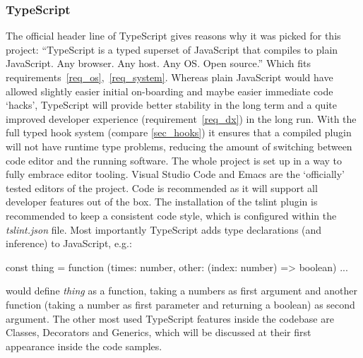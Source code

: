 \subsubsection*{TypeScript}
 The official header line of TypeScript gives reasons why
  it was picked for this project: ``TypeScript is a typed superset of JavaScript that compiles
  to plain JavaScript. Any browser. Any host. Any OS\@. Open
  source.''\cite{noauthor_typescript_2018} Which fits
  requirements~\ref{req_os},~\ref{req_system}. Whereas plain JavaScript would
  have allowed slightly easier initial on-boarding and maybe easier immediate
  code `hacks', TypeScript will provide better stability in the long term and a
  quite improved developer experience (requirement~\ref{req_dx}) in the long
  run. With the full typed hook system (compare \autoref{sec_hooks}) it ensures
  that a compiled plugin will not have runtime type problems, reducing the
  amount of switching between code editor and the running software. The whole
  project is set up in a way to fully embrace editor tooling. Visual Studio
  Code\cite*{noauthor_visual_nodate} and Emacs\cite*{noauthor_gnu_nodate} are
  the `officially' tested editors of the project. Code is recommended as it will
  support all developer features out of the box. The installation of the
  tslint\cite*{noauthor_tslint_nodate} plugin\cite*{noauthor_tslint_nodate-1} is
  recommended to keep a consistent code style, which is configured within the
  \emph{tslint.json} file. Most importantly TypeScript adds type declarations
  (and inference) to JavaScript, e.g.:
\begin{typescript}
const thing = function (times: number, other: (index: number) => boolean) { ... }
\end{typescript}
would define \emph{thing} as a function, taking a numbers as first argument and
another function (taking a number as first parameter and returning a boolean) as
second argument. The other most used TypeScript features inside the codebase are
Classes\cite*{noauthor_classes_nodate},
Decorators\cite*{noauthor_decorators_nodate} and
Generics\cite*{noauthor_generics_nodate}, which will be discussed at their first
appearance inside the code samples.
